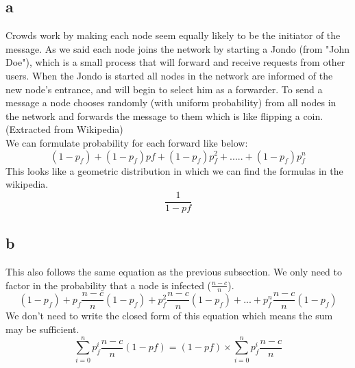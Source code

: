 \documentclass[a4paper, 11pt]{article}
\begin{document}
\subsection{a}
Crowds work by making each node seem equally likely to be the initiator of
the message. As we said each node joins the network by starting a Jondo
(from "John Doe"), which is a small process that will forward and receive
requests from other users. When the Jondo is started all nodes in the network
are informed of the new node's entrance, and will begin to select him as a
forwarder. To send a message a node chooses randomly
(with uniform probability) from all nodes in the network and forwards
the message to them which is like flipping a coin. (Extracted from Wikipedia) \\
We can formulate probability for each forward like below:
\begin{equation}
    (1-p_f)+ (1-p_f)pf+ (1-p_f)p_f^2+ ..... +(1-p_f)p_f^{n}
\end{equation}
This looks like a geometric distribution in which we can find the formulas in
the wikipedia.
\begin{equation}
    \frac{1}{1-pf}
\end{equation}
\subsection{b}
This also follows the same equation as the previous subsection. We only need
to factor in the probability that a node is infected ($\frac{n-c}{n}$).
\begin{equation}
    (1-p_f) + p_f\frac{n-c}{n}(1-p_f) + p_f^2 \frac{n-c}{n}(1-p_f) + ... + p_f^{n} \frac{n-c}{n} (1-p_f)
\end{equation}
We don't need to write the closed form of this equation which means the sum
may be sufficient.
\begin{equation}
    \sum_{i=0}^{n} p_f^i \frac{n-c}{n} (1-pf) = (1-pf) \times \sum_{i=0}^{n} p_f^i \frac{n-c}{n}
\end{equation}
\end{document}
